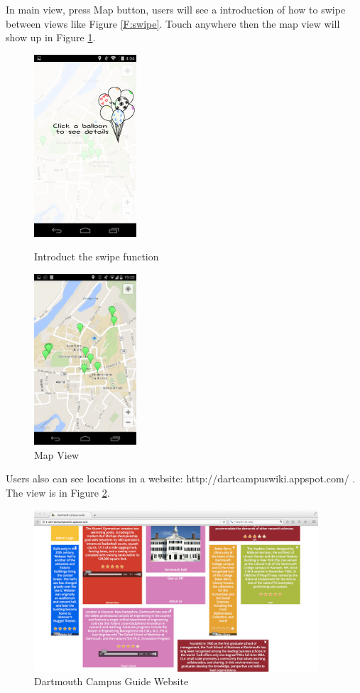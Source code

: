 \documentclass{article}
\begin{document}
In main view, press Map button, users will see a introduction of how to swipe between views like Figure \ref{F:swipe}. Touch anywhere then the map view will show up in Figure \ref{F:map}.

\begin{figure}[h!]
\begin{minipage}[h!]{0.5\linewidth}
\centering
\includegraphics[width=1.5in]{figures/map_intro.png}
\caption{Introduct the swipe function}
\label{F:swipe}
\end{minipage}%
\begin{minipage}[h!]{0.5\linewidth}
\centering
\includegraphics[width=1.5in]{figures/map.png}
\caption{Map View}
\label{F:map}
\end{minipage}
\end{figure}

Users also can see locations in a website: http://dartcampuswiki.appspot.com/ . The view is in Figure \ref{F:server}.

\begin{figure}[h!]   
\centering
\includegraphics[width = 300pt]{Figures/server.png}
\caption{Dartmouth Campus Guide Website}
\label{F:server}
\end{figure}
\end{document}
